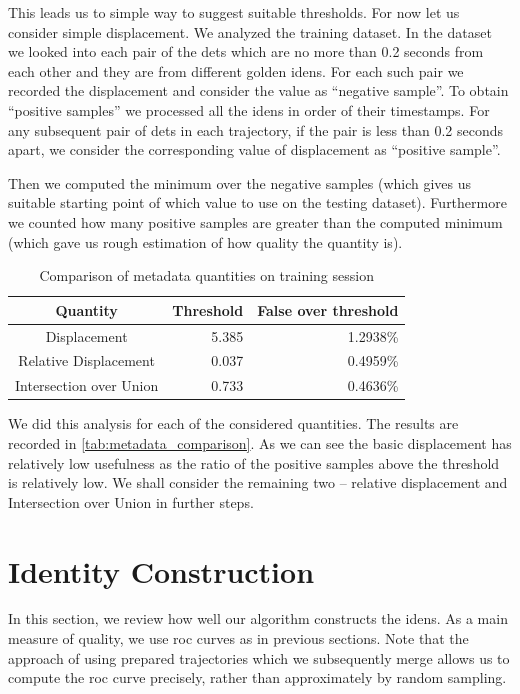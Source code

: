 This leads us to simple way to suggest suitable thresholds. For now let us consider simple displacement. We analyzed the training dataset. In the dataset we looked into each pair of the \glspl{det} which are no more than 0.2 seconds from each other and they are from different golden \glspl{iden}. For each such pair we recorded the displacement and consider the value as ``negative sample''. To obtain ``positive samples'' we processed all the \glspl{iden} in order of their timestamps. For any subsequent pair of \glspl{det} in each trajectory, if the pair is less than 0.2 seconds apart, we consider the corresponding value of displacement as ``positive sample''.

Then we computed the minimum over the negative samples (which gives us suitable starting point of which value to use on the testing dataset). Furthermore we counted how many positive samples are greater than the computed minimum (which gave us rough estimation of how quality the quantity is).

\begin{table}[]
    \centering
    \begin{tabular}{c|r|r}
         Quantity & Threshold & False over threshold  \\ \hline
         Displacement & 5.385 & 1.2938\% \\
         Relative Displacement & 0.037 & 0.4959\% \\
         Intersection over Union & 0.733 & 0.4636\%
    \end{tabular}
    \caption{Comparison of metadata quantities on training session}
    \label{tab:metadata_comparison}
\end{table}

We did this analysis for each of the considered quantities. The results are recorded in \autoref{tab:metadata_comparison}. As we can see the basic displacement has relatively low usefulness as the ratio of the positive samples above the threshold is relatively low. We shall consider the remaining two -- relative displacement and Intersection over Union in further steps.

\section{Identity Construction}

In this section, we review how well our algorithm constructs the \glspl{iden}. As a main measure of quality, we use \gls{roc} curves as in previous sections. Note that the approach of using prepared trajectories which we subsequently merge allows us to compute the \gls{roc} curve precisely, rather than approximately by random sampling.


